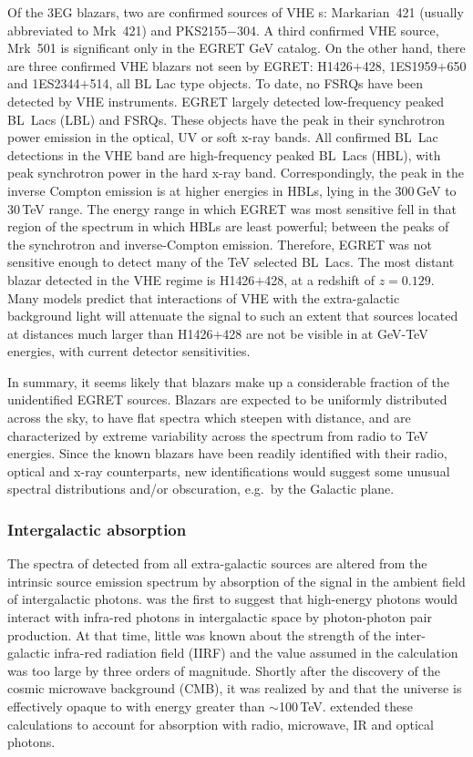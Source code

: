Of the 3EG blazars, two are confirmed sources of VHE {\Grayc}s:
Markarian~421 (usually abbreviated to Mrk~421) and PKS2155$-$304. A
third confirmed VHE source, Mrk~501 is significant only in the EGRET
GeV catalog. On the other hand, there are three confirmed VHE blazars
not seen by EGRET: H1426$+$428, 1ES1959$+$650 and 1ES2344$+$514, all
BL Lac type objects. To date, no FSRQs have been detected by VHE
instruments. EGRET largely detected low-frequency peaked BL~Lacs (LBL)
and FSRQs. These objects have the peak in their synchrotron power
emission in the optical, UV or soft x-ray bands. All confirmed BL~Lac
detections in the VHE band are high-frequency peaked BL~Lacs (HBL),
with peak synchrotron power in the hard x-ray band. Correspondingly,
the peak in the inverse Compton emission is at higher energies in
HBLs, lying in the 300\,GeV to 30\,TeV range. The energy range in
which EGRET was most sensitive fell in that region of the spectrum in
which HBLs are least powerful; between the peaks of the synchrotron
and inverse-Compton emission. Therefore, EGRET was not sensitive
enough to detect many of the TeV selected BL~Lacs. The most distant
blazar detected in the VHE regime is H1426$+$428, at a redshift of
$z=0.129$. Many models predict that interactions of VHE \Grays with
the extra-galactic background light will attenuate the \Gray signal to
such an extent that sources located at distances much larger than
H1426$+$428 are not be visible in \Grays at GeV-TeV energies, with
current detector sensitivities.

In summary, it seems likely that blazars make up a considerable
fraction of the unidentified EGRET sources. Blazars are expected to be
uniformly distributed across the sky, to have flat spectra which
steepen with distance, and are characterized by extreme variability
across the spectrum from radio to TeV energies. Since the known \Gray
blazars have been readily identified with their radio, optical and
x-ray counterparts, new identifications would suggest some unusual
spectral distributions and/or obscuration, e.g.\ by the Galactic plane.

\subsubsection*{\boldmath Intergalactic \Gray absorption}

The spectra of \Grays detected from all extra-galactic sources are
altered from the intrinsic source emission spectrum by absorption of
the signal in the ambient field of intergalactic
photons. \citet{REF::NIKISHOV::JETP1961} was the first to suggest that
high-energy photons would interact with infra-red photons in
intergalactic space by photon-photon pair production. At that time,
little was known about the strength of the inter-galactic infra-red
radiation field (IIRF) and the value assumed in the calculation was
too large by three orders of magnitude. Shortly after the discovery of
the cosmic microwave background (CMB), it was realized by
\citet{REF::GOULD_SCHREDER::PRL1966} and \citet{REF::JELLEY::PRL1966}
that the universe is effectively opaque to \Grays with energy greater
than $\sim$100\,TeV. \citet{REF::GOULD_SCHREDER::PR1967} extended these
calculations to account for absorption with radio, microwave, IR and
optical photons.

